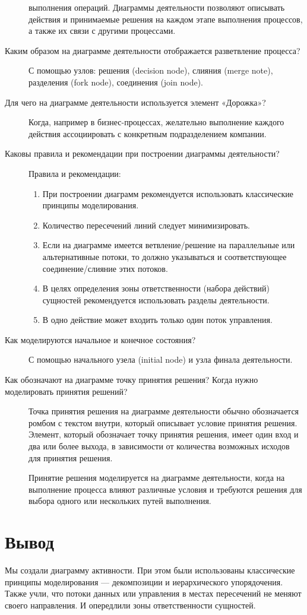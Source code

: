 \begin{description}
		выполнения операций. Диаграммы деятельности позволяют описывать
		действия и принимаемые решения на каждом этапе выполнения процессов,
		а также их связи с другими процессами.
	\item [Каким образом на диаграмме деятельности отображается
		разветвление процесса?]
		С помощью узлов: решения (decision node), слияния (merge note),
		разделения (fork node), соединения (join node).
	\item [Для чего на диаграмме деятельности используется элемент
		«Дорожка»?]
		Когда, например в бизнес-процессах, желательно выполнение каждого
		действия ассоциировать с конкретным подразделением компании.
	\item [Каковы правила и рекомендации при построении диаграммы
		деятельности?]
		Правила и рекомендации:
		\begin{enumerate}
			\item При построении диаграмм рекомендуется использовать
				классические принципы моделирования.
			\item Количество пересечений линий следует минимизировать.
			\item Если на диаграмме имеется ветвление/решение на параллельные
				или альтернативные потоки, то должно указываться
				и соответствующее соединение/слияние этих потоков.
			\item В целях определения зоны ответственности (набора действий)
				сущностей рекомендуется использовать разделы деятельности.
			\item В одно действие может входить только один поток управления.
		\end{enumerate}
	\item [Как моделируются начальное и конечное состояния?]
		С помощью начального узела (initial node) и узла финала деятельности.
	\item [Как обозначают на диаграмме точку принятия решения? Когда
		нужно моделировать принятия решений?]
		Точка принятия решения на диаграмме деятельности обычно обозначается
		ромбом с текстом внутри, который описывает условие принятия решения.
		Элемент, который обозначает точку принятия решения, имеет один вход
		и два или более выхода, в зависимости от количества возможных исходов
		для принятия решения.\par
		Принятие решения моделируется на диаграмме деятельности, когда на
		выполнение процесса влияют различные условия и требуются решения для
		выбора одного или нескольких путей выполнения.
\end{description}

\clearpage

\section*{\LARGE Вывод}
Мы создали диаграмму активности.
При этом были использованы классические
принципы моделирования --- декомпозиции и иерархического упорядочения.
Также учли, что потоки данных или управления в местах пересечений не
меняют своего направления. И опередлили зоны ответственности сущностей.

